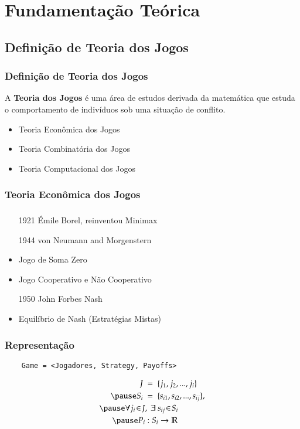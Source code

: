 \section{Fundamentação Teórica}
\subsection{Definição de Teoria dos Jogos}
\begin{frame}
\frametitle{Definição de Teoria dos Jogos}
\begin{block}{}
	A \textbf{Teoria dos Jogos} é uma área de estudos derivada da matemática que estuda o comportamento de indivíduos sob uma situação de conflito.
\end{block}
\begin{itemize}
	\item Teoria Econômica dos Jogos
	\item Teoria Combinatória dos Jogos
	\item Teoria Computacional dos Jogos
\end{itemize}
\end{frame}

\subsubsection{Teoria Econômica dos Jogos}
\begin{frame}
\frametitle{\subsubsecname}
\begin{itemize}
	\item[1921] Émile Borel, reinventou Minimax
	\item[1944] von Neumann and Morgenstern
	\item Jogo de Soma Zero
	\item Jogo Cooperativo e Não Cooperativo
	\item[1950] John Forbes Nash
	\item Equilíbrio de Nash (Estratégias Mistas)
\end{itemize}
\end{frame}

\begin{frame}[fragile]
\frametitle{Representação}
\begin{lstlisting}
    Game = <Jogadores, Strategy, Payoffs>
\end{lstlisting}
\pause
\begin{equation*}
\begin{split}
  J\ &=\ \{j_1, j_2,...,j_i\}\\
  \pause
  S_{i}\ &=\ \{s_{i1},s_{i2},...,s_{ij}\},\\
  \pause
  \forall j_i\!\in\!J&,\ \exists\ s_{ij}\!\in\!S_i\\
  \pause
  P_i &: S_{i}\rightarrow\mathbb{R}
\end{split}
\end{equation*}
\end{frame}

